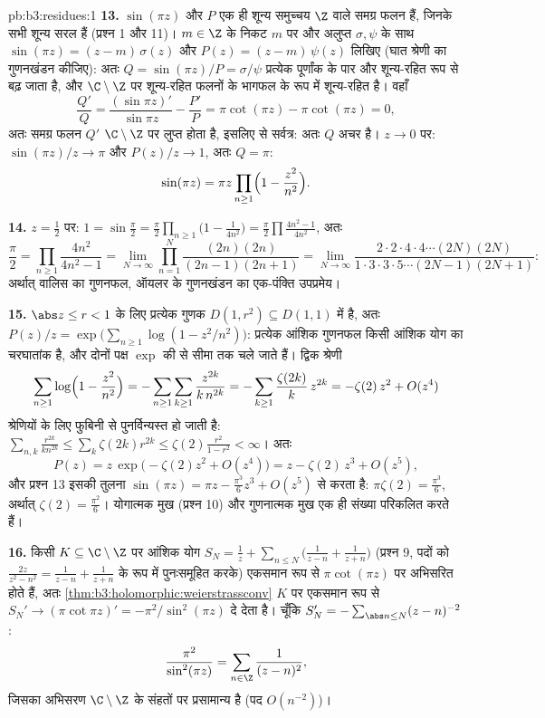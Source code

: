 \begin{solution}{pb:b3:residues:1}
\textbf{13.} $\sin(\pi z)$ और $P$ एक ही शून्य समुच्चय $\Z$ वाले समग्र फलन
हैं, जिनके सभी शून्य सरल हैं (प्रश्न 1 और 11)। $m \in \Z$ के निकट $m$
पर  और अलुप्त $\sigma, \psi$ के साथ $\sin(\pi z) = (z - m)\,\sigma(z)$ और $P(z) = (z - m)\,\psi(z)$ लिखिए (घात
श्रेणी का गुणनखंडन कीजिए): अतः $Q =
\sin(\pi z)/P = \sigma/\psi$ प्रत्येक पूर्णांक के पार
 और शून्य-रहित रूप से बढ़ जाता है, और $\C\setminus\Z$ पर शून्य-रहित
फलनों के भागफल के रूप में शून्य-रहित है। वहाँ
\[
\frac{Q'}{Q} = \frac{(\sin\pi z)'}{\sin\pi z} -
\frac{P'}{P} = \pi\cot(\pi z) - \pi\cot(\pi z) = 0 ,
\]
अतः समग्र फलन $Q'$ $\C\setminus\Z$ पर लुप्त होता है, इसलिए  से सर्वत्र:
अतः $Q$ अचर है। $z \to
0$ पर: $\sin(\pi z)/z \to \pi$ और $P(z)/z \to 1$, अतः $Q =
\pi$:
\[
\sin(\pi z) = \pi z\prod_{n\geq1}
\Bigl(1 - \frac{z^2}{n^2}\Bigr) .
\]

\textbf{14.} $z = \frac12$ पर: $1 = \sin\frac\pi2 =
\frac\pi2\prod_{n\geq1}\bigl(1 - \frac1{4n^2}\bigr) =
\frac\pi2\prod\frac{4n^2-1}{4n^2}$, अतः
\[
\frac\pi2 = \prod_{n\geq1}\frac{4n^2}{4n^2 - 1}
= \lim_{N\to\infty}\prod_{n=1}^N
\frac{(2n)(2n)}{(2n-1)(2n+1)}
= \lim_{N\to\infty}
\frac{2\cdot2\cdot4\cdot4\cdots(2N)(2N)}
{1\cdot3\cdot3\cdot5\cdots(2N-1)(2N+1)} :
\]
अर्थात् वालिस का गुणनफल, ऑयलर के गुणनखंडन का एक-पंक्ति उपप्रमेय।

\textbf{15.} $\abs z \leq r < 1$ के लिए प्रत्येक गुणक $D(1, r^2) \subseteq D(1, 1)$ में है, अतः $P(z)/z = \exp\bigl(
\sum_{n\geq1}\log(1 - z^2/n^2)\bigr)$:
प्रत्येक आंशिक गुणनफल किसी आंशिक योग का चरघातांक है, और दोनों पक्ष
$\exp$ की  से सीमा तक चले जाते हैं। द्विक श्रेणी
\[
\sum_{n\geq1}\log\Bigl(1 - \frac{z^2}{n^2}\Bigr)
= -\sum_{n\geq1}\sum_{k\geq1}\frac{z^{2k}}{k\,n^{2k}}
= -\sum_{k\geq1}\frac{\zeta(2k)}k\,z^{2k}
= -\zeta(2)\,z^2 + O(z^4)
\]
श्रेणियों के लिए फुबिनी से पुनर्विन्यस्त हो जाती है: $\sum_{n,k}
\frac{r^{2k}}{kn^{2k}} \leq \sum_k\zeta(2k)r^{2k} \leq
\zeta(2)\frac{r^2}{1-r^2} < \infty$। अतः
\[
P(z) = z\,\exp\bigl(-\zeta(2)z^2 + O(z^4)\bigr)
= z - \zeta(2)\,z^3 + O(z^5) ,
\]
और प्रश्न 13 इसकी तुलना $\sin(\pi z) = \pi z -
\frac{\pi^3}6z^3 + O(z^5)$ से करता है: $\pi\zeta(2) = \frac{\pi^3}6$, अर्थात् $\zeta(2) = \frac{\pi^2}6$। योगात्मक
मुख (प्रश्न 10) और गुणनात्मक मुख एक ही संख्या परिकलित करते हैं।

\textbf{16.} किसी  $K \subseteq \C\setminus\Z$ पर आंशिक योग $S_N = \frac1z + \sum_{n\leq N}\bigl(
\frac1{z-n} + \frac1{z+n}\bigr)$ (प्रश्न 9, पदों को
$\frac{2z}{z^2-n^2} = \frac1{z-n} +
\frac1{z+n}$ के रूप में पुनःसमूहित करके) एकसमान रूप से $\pi\cot(\pi z)$ पर अभिसरित होते
हैं, अतः \cref{thm:b3:holomorphic:weierstrassconv} $K$ पर एकसमान रूप से $S_N' \to
(\pi\cot\pi z)' = -\pi^2/\sin^2(\pi z)$ दे देता है। चूँकि $S_N' = -\sum_{\abs n\leq N}(z - n)^{-2}$:
\[
\frac{\pi^2}{\sin^2(\pi z)} =
\sum_{n\in\Z}\frac1{(z - n)^2} ,
\]
जिसका अभिसरण $\C\setminus\Z$ के संहतों पर प्रसामान्य है (पद $O(n^{-2})$)।


\end{solution}
